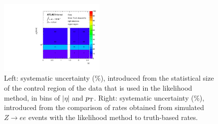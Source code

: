 \begin{figure}[p!]
\begin{center}
  \includegraphics[width=0.45\textwidth]{figures/qmisid/syst_Data_Truthclosure_tight_sr}
  \caption{ \label{fig:QMisID:systa} Left: systematic uncertainty (\%), introduced from the statistical size of the control 
            region of the data that is used in the likelihood method, in bins of $|\eta|$ and $p_{\mathrm{T}}$. Right: systematic uncertainty 
            (\%), introduced from the comparison of rates obtained from simulated $Z\rightarrow ee$ events with the likelihood 
            method to truth-based rates.}
  \end{center}
\end{figure}

